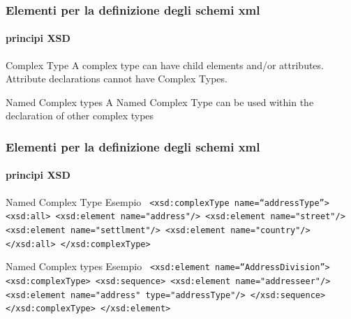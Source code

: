 


\begin{frame}
	\frametitle{Elementi per la definizione degli schemi xml}
	\framesubtitle{principi XSD}
	\addtocounter{nframe}{1}

	\begin{block}{Complex Type}
		A complex type can have child elements and/or attributes.
		\\ Attribute declarations cannot have Complex Types.

	\end{block}

	\begin{block}{Named Complex types}
		A Named Complex Type can be used within the declaration of other complex types
	\end{block}

\end{frame}




\begin{frame}
	\frametitle{Elementi per la definizione degli schemi xml}
	\framesubtitle{principi XSD}
	\addtocounter{nframe}{1}

	\begin{block}{Named Complex Type Esempio}
		\texttt{
			<xsd:complexType name=``addressType''>
			<xsd:all>
			<xsd:element name="address"/>
			<xsd:element name="street"/>
			<xsd:element name="settlment"/>
			<xsd:element name="country"/>
			</xsd:all>
			</xsd:complexType>
		}
	\end{block}

	\begin{block}{Named Complex types Esempio}
		\texttt{
			<xsd:element name=``AddressDivision''>
			<xsd:complexType>
			<xsd:sequence>
			<xsd:element name="addresseer"/>
			<xsd:element name="address" type="addressType"/>
			</xsd:sequence>
			</xsd:complexType>
			</xsd:element>
		}
	\end{block}

\end{frame}


